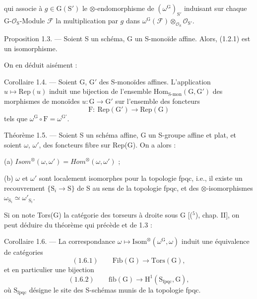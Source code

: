 
qui associe à $g\in \mathrm{G}(\mathrm{S}')$ le $\otimes$-endomorphisme de $(\omega^{\mathrm{G}})_{\mathrm{S}'}$ induisant sur chaque
G-$\mathcal{O}_{\mathrm{S}}$-Module $\mathcal{F}$ la multiplication par $g$ dans $\omega^{\mathrm{G}}(\mathcal{F})\otimes_{\mathcal{O}_{\mathrm{S}}}\mathcal{O}_{\mathrm{S}'}$.

Proposition 1.3. --- Soient S un schéma, G un S-monoïde affine. Alors,
(1.2.1) est un isomorphisme.

On en déduit aisément :

Corollaire 1.4. --- Soient G, G$'$ des S-monoïdes affines. L'application
$u\mapsto \mathrm{Rep}(u)$ induit une bijection de l'ensemble $\mathrm{Hom}_{\text{S-mon}}(\mathrm{G},\mathrm{G}')$ des
morphismes de monoïdes $u:\mathrm{G}\to\mathrm{G}'$ sur l'ensemble des foncteurs
\[ \mathrm{F}:\ \mathrm{Rep}(\mathrm{G}')\to\mathrm{Rep}(\mathrm{G}) \]
tels que $\omega^{\mathrm{G}}\circ\mathrm{F}=\omega^{\mathrm{G}'}$.

Théorème 1.5. --- Soient S un schéma affine, G un S-groupe affine et plat,
et soient $\omega$, $\omega'$, des foncteurs fibre sur Rep(G). On a alors :

(a) $\mathit{Isom}^{\otimes}(\omega,\omega')=\mathit{Hom}^{\otimes}(\omega,\omega')$ ;

(b) $\omega$ et $\omega'$ sont localement isomorphes pour la topologie fpqc, i.e., il
existe un recouvrement $\{\mathrm{S}_i\to\mathrm{S}\}$ de S au sens de la topologie fpqc, et des
$\otimes$-isomorphismes $\omega_{\mathrm{S}_i}\simeq\omega'_{\mathrm{S}_i}$.

Si on note Tors(G) la catégorie des torseurs à droite sous G [($^5$), chap. II],
on peut déduire du théorème qui précède et de 1.3 :

Corollaire 1.6. --- La correspondance $\omega\mapsto\mathrm{Isom}^{\otimes}(\omega^{\mathrm{G}},\omega)$ induit une
équivalence de catégories
\[ (1.6.1)\qquad \mathrm{Fib}(\mathrm{G})\to\mathrm{Tors}(\mathrm{G}), \]
et en particulier une bijection
\[ (1.6.2)\qquad \mathrm{fib}(\mathrm{G})\to\mathrm{H}^1(\mathrm{S}_{\mathrm{fpqc}},\mathrm{G}), \]
où $\mathrm{S}_{\mathrm{fpqc}}$ désigne le site des S-schémas munis de la topologie fpqc.

